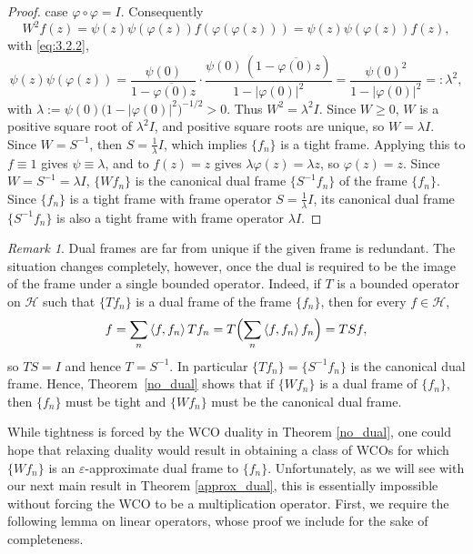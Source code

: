 \documentclass{amsart}
\theoremstyle{definition}
\theoremstyle{remark}
\newtheorem{remark}[thm]{Remark}
\numberwithin{equation}{section}
\newcommand{\ip}[2]{\left\langle {#1} , {#2} \right\rangle} %
\begin{document}
\begin{proof}
case $\varphi\circ\varphi=I$. Consequently
$$W^{2}f(z)=\psi(z)\psi(\varphi(z))f(\varphi(\varphi(z)))
 =\psi(z)\psi(\varphi(z))f(z),$$
 with \eqref{eq:3.2.2},
\[
  \psi(z)\psi(\varphi(z))
  =\frac{\psi(0)}{1-\overline{\varphi(0)}z}\cdot
   \frac{\psi(0)\,(1-\overline{\varphi(0)}z)}{1-|\varphi(0)|^{2}}
  =\frac{\psi(0)^{2}}{1-|\varphi(0)|^{2}}=:\lambda^{2},
\]
with $\lambda:=\psi(0)\bigl(1-|\varphi(0)|^{2}\bigr)^{-1/2}>0$.  Thus $W^{2}=\lambda^{2}I$.
Since $W\ge0$, $W$ is a positive square root of $\lambda^{2}I$, and positive
square roots are unique, so $W=\lambda I$. Since $W = S^{-1}$, then $S = \frac{1}{\lambda}I$, which implies $\{f_n\}$ is a tight frame. Applying this to $f\equiv1$ gives
$\psi\equiv\lambda$, and to $f(z)=z$ gives $\lambda\varphi(z)=\lambda z$, so
$\varphi(z)=z$. Since $W = S^{-1}=\lambda I$, $\{ Wf_n\}$ is the canonical dual frame $\{ S^{-1}f_n\}$ of the frame $\{f_n\}$. Since $\{f_n\}$ is a tight frame with frame operator $S = \frac{1}{\lambda}I$, its canonical dual frame $\{ S^{-1}f_n\}$ is also a tight frame with frame operator $\lambda I$.
\end{proof}
\begin{remark}\label{remark:canonical}
Dual frames are far from unique if the given frame is redundant. The situation changes completely, however, once the dual is required to be the image of the frame under a single bounded operator.  Indeed, if $T$ is a bounded operator on $\mathcal H$ such that $\{Tf_n\}$ is a dual frame of the frame $\{f_n\}$, then
for every $f\in\mathcal H$,
\[
  f=\sum_{n}\ip{f}{f_n}Tf_n=T\Bigl(\sum_{n}\ip{f}{f_n}f_n\Bigr)=TSf ,
\]
so $TS=I$ and hence $T=S^{-1}$. In particular $\{Tf_n\}=\{S^{-1}f_n\}$ is the
canonical dual frame. Hence, Theorem~\ref{no_dual} shows that if $\{ Wf_n\}$ is a dual frame of $\{ f_n\}$, then $\{ f_n\}$ must be tight and $\{ Wf_n\}$ must be the canonical dual frame.
\end{remark}


While tightness is forced by the WCO duality in Theorem \ref{no_dual}, one could hope that relaxing duality would result in obtaining a class of WCOs for which $\{Wf_{n}\}$ is an $\varepsilon$-approximate dual frame to $\{f_{n}\}$. Unfortunately, as we will see with our next main result in Theorem \ref{approx_dual}, this is essentially impossible without forcing the WCO to be a multiplication operator. First, we require the following lemma on linear operators, whose proof we include for the sake of completeness. 
 
\end{document}

